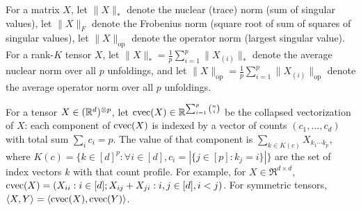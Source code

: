For a matrix $X$,
let $\|X\|_*$ denote the nuclear (trace) norm (sum of singular values),
let $\|X\|_F$ denote the Frobenius norm (square root of sum of squares of singular values),
let $\|X\|_\text{op}$ denote the operator norm (largest singular value).
For a rank-$K$ tensor $X$,
let $\|X\|_* = \frac{1}{p} \sum_{i=1}^p \|X_{(i)}\|_*$ denote
the average nuclear norm over all $p$ unfoldings,
and let $\|X\|_\text{op} = \frac{1}{p} \sum_{i=1}^p \|X_{(i)}\|_\text{op}$
denote the average operator norm over all $p$ unfoldings.

For a tensor $X \in (\mathbb{R}^d)^{\otimes p}$,
let $\operatorname{cvec}(X) \in \mathbb{R}^{\sum_{i=1}^p \binom{n}{i}}$ be
the collapsed vectorization of $X$: each component of $\operatorname{cvec}(X)$
is indexed by a vector of counts $(c_1, \dots, c_d)$ with total sum $\sum_i c_i = p$.
The value of that component is
$\sum_{k \in K(c)} X_{k_1 \cdots k_p}$,
where $K(c) = \{ k \in [d]^p : \forall i \in [d], c_i = |\{ j \in [p] : k_j = i \}| \}$ are the set of index vectors $k$ with that count profile.
For example, for $X \in \Re^{d \times d}$,
$\operatorname{cvec}(X) = (X_{ii} : i \in [d]; X_{ij} + X_{ji} : i,j \in [d], i<j)$.
For symmetric tensors, $\langle X, Y \rangle = \langle \operatorname{cvec}(X), \operatorname{cvec}(Y) \rangle$.
